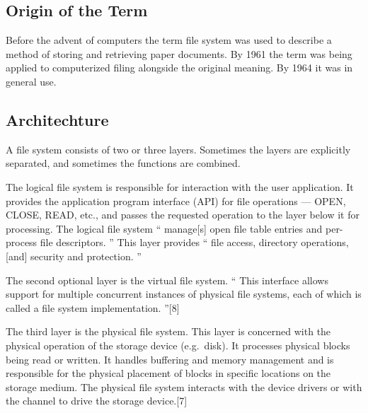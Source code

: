 \subsection{Origin of the Term}
\label{ssec:origin_of_the_term}

Before the advent of computers the term file system was used to describe a
method of storing and retrieving paper documents. By 1961 the term was being
applied to computerized filing alongside the original meaning. By 1964 it was
in general use.



\subsectionend




\subsection{Architechture}
\label{ssec:architechture}

A file system consists of two or three layers. Sometimes the layers are
explicitly separated, and sometimes the functions are combined.



The logical file system is responsible for interaction with the user
application. It provides the application program interface (API) for file
operations — OPEN, CLOSE, READ, etc., and passes the requested operation to the
layer below it for processing. The logical file system `` manage[s] open file
table entries and per-process file descriptors. '' This layer provides `` file
access, directory operations, [and] security and protection. ''



The second optional layer is the virtual file system. `` This interface allows
support for multiple concurrent instances of physical file systems, each of
which is called a file system implementation. ''[8]



The third layer is the physical file system. This layer is concerned with the
physical operation of the storage device (e.g.\ disk). It processes physical
blocks being read or written. It handles buffering and memory management and is
responsible for the physical placement of blocks in specific locations on the
storage medium. The physical file system interacts with the device drivers or
with the channel to drive the storage device.[7]


\subsectionend







